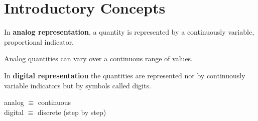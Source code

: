 \chapter{Introductory Concepts}

        \par In \textbf{analog representation}, a quantity is represented by a continuously
        variable, proportional indicator.
        \par Analog quantities can vary over a continuous range of values.
        \par In \textbf{digital representation} the quantities are represented not by
        continuously variable indicators but by symbols called digits.
        \begin{center}
            analog $\equiv$ continuous \\
            digital $\equiv$ discrete (step by step)
        \end{center}

